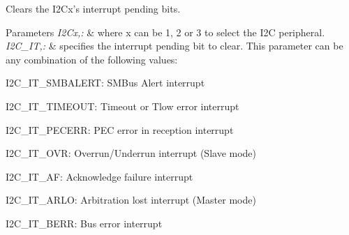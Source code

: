 Clears the I2\-Cx's interrupt pending bits. 


\begin{DoxyParams}{Parameters}
{\em I2\-Cx,\-:} & where x can be 1, 2 or 3 to select the I2\-C peripheral. \\
\hline
{\em I2\-C\-\_\-\-I\-T,\-:} & specifies the interrupt pending bit to clear. This parameter can be any combination of the following values\-: \begin{DoxyItemize}
\item I2\-C\-\_\-\-I\-T\-\_\-\-S\-M\-B\-A\-L\-E\-R\-T\-: S\-M\-Bus Alert interrupt \item I2\-C\-\_\-\-I\-T\-\_\-\-T\-I\-M\-E\-O\-U\-T\-: Timeout or Tlow error interrupt \item I2\-C\-\_\-\-I\-T\-\_\-\-P\-E\-C\-E\-R\-R\-: P\-E\-C error in reception interrupt \item I2\-C\-\_\-\-I\-T\-\_\-\-O\-V\-R\-: Overrun/\-Underrun interrupt (Slave mode) \item I2\-C\-\_\-\-I\-T\-\_\-\-A\-F\-: Acknowledge failure interrupt \item I2\-C\-\_\-\-I\-T\-\_\-\-A\-R\-L\-O\-: Arbitration lost interrupt (Master mode) \item I2\-C\-\_\-\-I\-T\-\_\-\-B\-E\-R\-R\-: Bus error interrupt\end{DoxyItemize}
\\
\hline
\end{DoxyParams}
